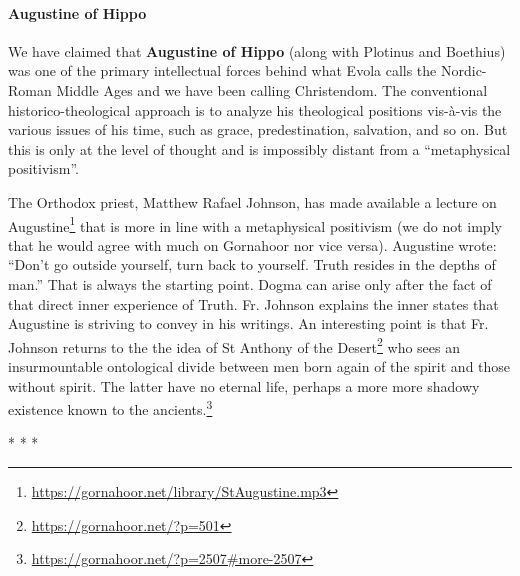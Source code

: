 \paragraph{Augustine of Hippo}


We have claimed that \textbf{Augustine of Hippo} (along with Plotinus and Boethius) was one of the primary intellectual forces behind what Evola calls the Nordic-Roman Middle Ages and we have been calling Christendom. The conventional historico-theological approach is to analyze his theological positions vis-à-vis the various issues of his time, such as grace, predestination, salvation, and so on. But this is only at the level of thought and is impossibly distant from a ``metaphysical positivism''.

The Orthodox priest, Matthew Rafael Johnson, has made available a lecture on Augustine\footnote{\url{https://gornahoor.net/library/StAugustine.mp3}} that is more in line with a metaphysical positivism (we do not imply that he would agree with much on Gornahoor nor vice versa). Augustine wrote: ``Don't go outside yourself, turn back to yourself. Truth resides in the depths of man.'' That is always the starting point. Dogma can arise only after the fact of that direct inner experience of Truth. Fr. Johnson explains the inner states that Augustine is striving to convey in his writings. An interesting point is that Fr. Johnson returns to the the idea of St Anthony of the Desert\footnote{\url{https://gornahoor.net/?p=501}} who sees an insurmountable ontological divide between men born again of the spirit and those without spirit. The latter have no eternal life, perhaps a more more shadowy existence known to the ancients.\footnote{\url{https://gornahoor.net/?p=2507\#more-2507}}



\begin{center}* * *\end{center}

